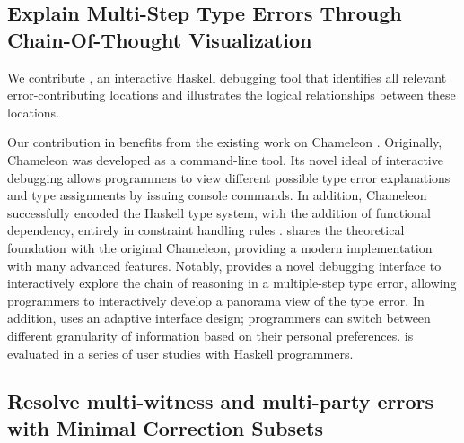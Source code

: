 \subsection*{Explain Multi-Step Type Errors Through Chain-Of-Thought Visualization}


We contribute \textbf{\chameleon{}}, an interactive Haskell debugging tool that identifies all relevant error-contributing locations and illustrates the logical relationships between these locations. 


Our contribution in \chameleon{} benefits from the existing work on Chameleon \cite{Stuckey2003-pz, Wazny2006-ll}. Originally,  Chameleon was developed as a command-line tool. Its novel ideal of interactive debugging allows programmers to view different possible type error explanations and type assignments by issuing console commands. In addition, Chameleon successfully encoded the Haskell type system, with the addition of functional dependency, entirely in constraint handling rules \cite{Fruhwirth1998-jq}. \chameleon{} shares the theoretical foundation with the original Chameleon, providing a modern implementation with many advanced features. Notably, \chameleon{} provides a novel debugging interface to interactively explore the chain of reasoning in a multiple-step type error, allowing programmers to interactively develop a panorama view of the type error. In addition, \chameleon{} uses an adaptive interface design; programmers can switch between different granularity of information based on their personal preferences. \chameleon{} is evaluated in a series of user studies with Haskell programmers.




\subsection*{Resolve multi-witness and multi-party errors with Minimal Correction Subsets}

